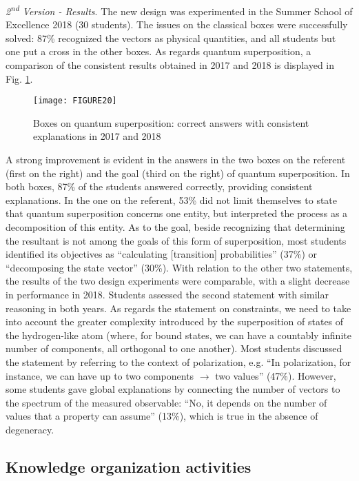 \documentclass[twocolumn,secnumarabic,amssymb, nobibnotes, aps, prd, nofootinbib]{revtex4-2}
\begin{document}
\emph{2\textsuperscript{nd} Version - Results}. The new design was experimented in the Summer School of Excellence 2018 (30 students). The issues on the classical boxes were successfully solved: 87\% recognized the vectors as physical quantities, and all students but one put a cross in the other boxes.
As regards quantum superposition, a comparison of the consistent results obtained in 2017 and 2018 is displayed in Fig. \ref{FIG:20}.
\begin{figure}[!htpb]
       \texttt{[image: FIGURE20]}
    \caption{Boxes on quantum superposition: correct answers with consistent explanations in 2017 and 2018}
    \label{FIG:20}
\end{figure}
A strong improvement is evident in the answers in the two boxes on the referent (first on the right) and the goal (third on the right) of quantum superposition. In both boxes, 87\% of the students answered correctly, providing consistent explanations. In the one on the referent, 53\% did not limit themselves to state that quantum superposition concerns one entity, but interpreted the process as a decomposition of this entity. As to the goal, beside recognizing that determining the resultant is not among the goals of this form of superposition, most students identified its objectives as ``calculating [transition] probabilities'' (37\%) or ``decomposing the state vector'' (30\%).
With relation to the other two statements, the results of the two design experiments were comparable, with a slight decrease in performance in 2018. Students assessed the second statement with similar reasoning in both years. As regards the statement on constraints, we need to take into account the greater complexity introduced by the superposition of states of the hydrogen-like atom (where, for bound states, we can have a countably infinite number of components, all orthogonal to one another). Most students discussed the statement by referring to the context of polarization, e.g. ``In polarization, for instance, we can have up to two components $\rightarrow$ two values'' (47\%). However, some students gave global explanations by connecting the number of vectors to the spectrum of the measured observable: ``No, it depends on the number of values that a property can assume'' (13\%), which is true in the absence of degeneracy.


\subsection{Knowledge organization activities} \label{Sec:5.3}
\end{document}
